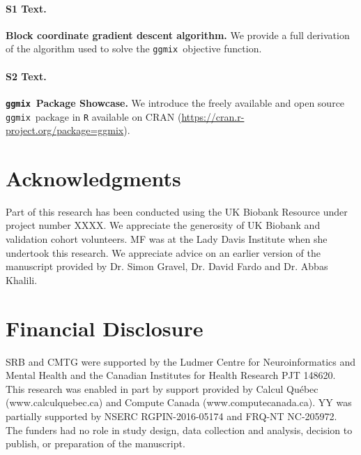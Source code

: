 \documentclass[10pt,letterpaper]{article}
\newcommand{\ggmix}{\texttt{ggmix}}
\begin{document}
\paragraph*{S1 Text.}
\label{S1_Text}
{\bf Block coordinate gradient descent algorithm.} We provide a full derivation of the algorithm used to solve the \ggmix ~objective function.


\paragraph*{S2 Text.}
\label{S2_Text}
{\bf \ggmix ~Package Showcase.} We introduce the freely available and open source \ggmix ~package in \texttt{R} available on CRAN (\url{https://cran.r-project.org/package=ggmix}).




\section*{Acknowledgments}
Part of this research has been conducted using the UK Biobank Resource under project number XXXX. We appreciate the generosity of UK Biobank and validation cohort volunteers. MF was at the Lady Davis Institute when she undertook this research. We appreciate advice on an earlier version of the manuscript provided by Dr. Simon Gravel, Dr. David Fardo and Dr. Abbas Khalili.





\section*{Financial Disclosure}
SRB and CMTG were supported by the Ludmer Centre for Neuroinformatics and Mental Health and the Canadian Institutes for Health Research PJT 148620. This research was enabled in part by support provided by Calcul Québec (www.calculquebec.ca) and Compute Canada (www.computecanada.ca). YY was partially supported by NSERC RGPIN-2016-05174 and FRQ-NT NC-205972. The funders had no role in study design, data collection and analysis, decision to publish, or preparation of the manuscript. 

\nolinenumbers

%
%
% 
\end{document}

